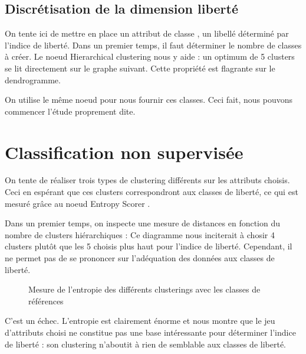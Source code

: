 \subsection{Discrétisation de la dimension \og liberté \fg}
On tente ici de mettre en place un attribut de \og classe \fg, un libellé déterminé par l'indice de liberté. Dans un premier temps, il faut déterminer le nombre de classes à créer. Le noeud \og Hierarchical clustering \fg nous y aide : un optimum de 5 clusters se lit directement sur le graphe suivant.
Cette propriété est flagrante sur le dendrogramme.

On utilise le même noeud pour nous fournir ces classes. Ceci fait, nous pouvons commencer l'étude proprement dite.

\section{Classification non supervisée}
On tente de réaliser trois types de clustering différents sur les attributs choisis. Ceci en espérant que ces clusters correspondront aux classes de liberté, ce qui est mesuré grâce au noeud \og Entropy Scorer \fg.


Dans un premier temps, on inspecte une mesure de distances en fonction du nombre de clusters hiérarchiques :
Ce diagramme nous inciterait à chosir 4 clusters plutôt que les 5 choisis plus haut pour l'indice de liberté. Cependant, il ne permet pas de se prononcer sur l'adéquation des données aux classes de liberté.

\begin{figure}[H]
	\centering
	\caption{Mesure de l'entropie des différents clusterings avec les classes de références}
\end{figure}
C'est un échec. L'entropie est clairement énorme et nous montre que le jeu d'attributs choisi ne constitue pas une base intéressante pour déterminer l'indice de liberté : son clustering n'aboutit à rien de semblable aux classes de liberté.

